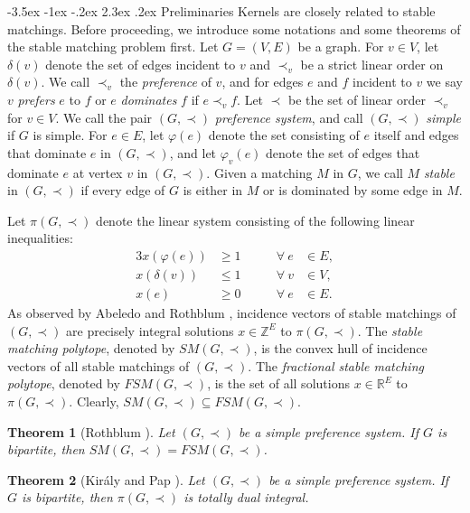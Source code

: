 \documentclass[11pt]{article}
\makeatletter
\newtheorem{theorem}{Theorem}%
\numberwithin{theorem}{section}
\renewcommand\section{%
  \@startsection{section}{1}
                {\z@}%
                {-3.5ex \@plus -1ex \@minus -.2ex}%
                {2.3ex \@plus.2ex}%
                {\large\bfseries}%
}
\makeatother
\begin{document}
\section{Preliminaries}
\label{pre}
Kernels are closely related to stable matchings.
Before proceeding, we introduce some notations and some theorems of the stable matching problem first.
Let $G=(V,E)$ be a graph.
For $v\in V$, let $\delta(v)$ denote the set of edges incident to $v$ and $\prec_v$ be a strict linear order on $\delta(v)$.
We call $\prec_v$ the \emph{preference} of $v$, and for edges $e$ and $f$ incident to $v$ we say $v$ \emph{prefers} $e$ to $f$ or $e$ \emph{dominates} $f$ if $e\prec_v f$.
Let $\prec$ be the set of linear order $\prec_v$ for $v\in V$.
We call the pair $(G,\prec)$ \emph{preference system}, and call $(G,\prec)$ \emph{simple} if $G$ is simple.
For $e\in E$, let $\varphi(e)$ denote the set consisting of $e$ itself and edges that dominate $e$ in $(G,\prec)$,
and let $\varphi_v(e)$ denote the set of edges that dominate $e$ at vertex $v$ in $(G,\prec)$.
Given a matching $M$ in $G$, we call $M$ \emph{stable} in $(G,\prec)$ if every edge of $G$ is either in $M$ or is dominated by some edge in $M$.

Let $\pi(G,\prec)$ denote the linear system consisting of the following linear inequalities:
\begin{alignat}{3}
x(\varphi(e)) &\geq 1 &\qquad \forall ~e &\in E,\label{stability constraints}\\
x(\delta(v)) &\leq 1 &\qquad \forall ~v &\in V,\label{matching constraints}\\
x(e) &\geq 0 &\qquad \forall ~e &\in E.\label{edge nonnegativity}
\end{alignat}
As observed by Abeledo and Rothblum \cite{AbelRoth94}, incidence vectors of stable matchings of $(G,\prec)$ are precisely integral solutions $x\in \mathbb{Z}^E$ to $\pi(G,\prec)$.
The \textit{stable matching polytope}, denoted by $SM(G,\prec)$, is the convex hull of incidence vectors of all stable matchings of $(G,\prec)$. The \textit{fractional stable matching polytope}, denoted by $FSM(G,\prec)$, is the set of all solutions $x\in \mathbb{R}^E$ to $\pi(G,\prec)$. Clearly, $SM(G,\prec)\subseteq FSM(G,\prec)$.

\begin{theorem}[Rothblum \cite{Roth92}]
\label{thm:Roth92}
Let $(G,\prec)$ be a simple preference system. If $G$ is bipartite, then
$SM(G,\prec)=FSM(G,\prec)$.
\end{theorem}

\begin{theorem}[Kir\'{a}ly and Pap \cite{KiraPap08}]
\label{thm:KiraPap08}
Let $(G,\prec)$ be a simple preference system. If $G$ is bipartite, then $\pi(G,\prec)$ is totally dual integral.
\end{theorem}
\end{document}
